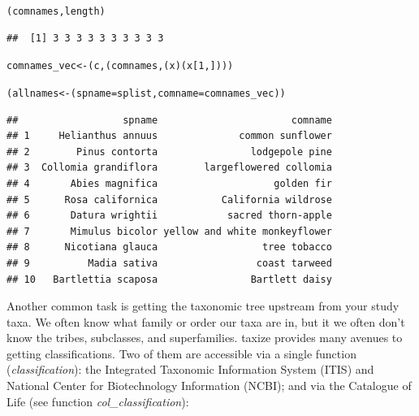 \begin{knitrout}
\begin{kframe}
\begin{alltt}
(comnames, length)
\end{alltt}
\begin{verbatim}
##  [1] 3 3 3 3 3 3 3 3 3 3
\end{verbatim}
\begin{alltt}

comnames_vec <- (c, (comnames, (x) (x[1, ])))

(allnames <- (spname = splist, comname = comnames_vec))
\end{alltt}
\begin{verbatim}
##                  spname                       comname
## 1     Helianthus annuus              common sunflower
## 2        Pinus contorta                lodgepole pine
## 3  Collomia grandiflora        largeflowered collomia
## 4       Abies magnifica                    golden fir
## 5      Rosa californica           California wildrose
## 6       Datura wrightii            sacred thorn-apple
## 7       Mimulus bicolor yellow and white monkeyflower
## 8      Nicotiana glauca                  tree tobacco
## 9          Madia sativa                 coast tarweed
## 10   Bartlettia scaposa                Bartlett daisy
\end{verbatim}
\end{kframe}
\end{knitrout}


Another common task is getting the taxonomic tree upstream from your study taxa. We often know what family or order our taxa are in, but it we often don't know the tribes, subclasses, and superfamilies. taxize provides many avenues to getting classifications. Two of them are accessible via a single function (\emph{classification}): the Integrated Taxonomic Information System (ITIS) and National Center for Biotechnology Information (NCBI); and via the Catalogue of Life (see function \emph{col\_classification}):

